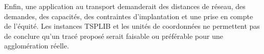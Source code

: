 Enfin, une application au transport demanderait des distances de réseau,
des demandes, des capacités, des contraintes d'implantation et une prise
en compte de l'équité. Les instances TSPLIB et les unités de coordonnées
ne permettent pas de conclure qu'un tracé proposé serait faisable ou
préférable pour une agglomération réelle.
